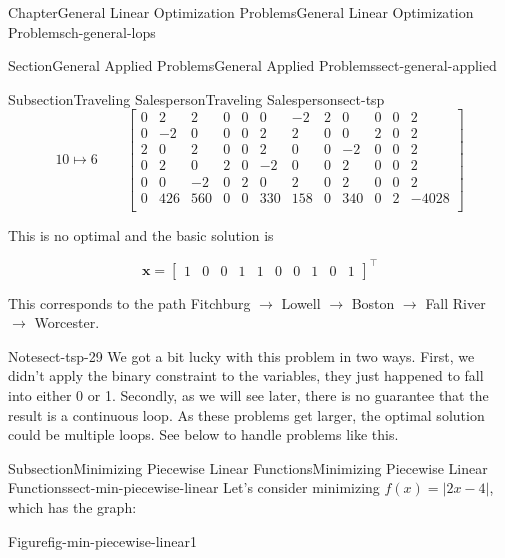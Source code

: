 \documentclass[oneside,10pt,]{book}
\numberwithin{equation}{section}
\newcommand{\amp}{&}
\begin{document}
\begin{chapterptx}{Chapter}{General Linear Optimization Problems}{}{General Linear Optimization Problems}{}{}{ch-general-lops}
\begin{sectionptx}{Section}{General Applied Problems}{}{General Applied Problems}{}{}{sect-general-applied}
\begin{subsectionptx}{Subsection}{Traveling Salesperson}{}{Traveling Salesperson}{}{}{sect-tsp}
\begin{equation*}
10 \mapsto 6 \qquad \left[\begin{array}{rrrrr|rrrrrr|r} 0 \amp 2 \amp 2 \amp 0 \amp 0 \amp 0 \amp -2 \amp 2 \amp 0 \amp 0 \amp 0 \amp 2\\ 0 \amp -2 \amp 0 \amp 0 \amp 0 \amp 2 \amp 2 \amp 0 \amp 0 \amp 2 \amp 0 \amp 2\\ 2 \amp 0 \amp 2 \amp 0 \amp 0 \amp 2 \amp 0 \amp 0 \amp -2 \amp 0 \amp 0 \amp 2\\ 0 \amp 2 \amp 0 \amp 2 \amp 0 \amp -2 \amp 0 \amp 0 \amp 2 \amp 0 \amp 0 \amp 2\\ 0 \amp 0 \amp -2 \amp 0 \amp 2 \amp 0 \amp 2 \amp 0 \amp 2 \amp 0 \amp 0 \amp 2\\ \hline 0 \amp 426 \amp 560 \amp 0 \amp 0 \amp 330 \amp 158 \amp 0 \amp 340 \amp 0 \amp 2 \amp -4028\\ \end{array} \right]
\end{equation*}
%
\par
This is no optimal and the basic solution is%
\par
%
\begin{equation*}
\boldsymbol{x} = \left[ \begin{array}{rrrrrrrrrr} 1 \amp 0 \amp 0 \amp 1 \amp 1 \amp 0 \amp 0 \amp 1  \amp 0 \amp 1 \end{array}\right]^{\intercal}
\end{equation*}
%
\par
This corresponds to the path Fitchburg \(\to\) Lowell \(\to\) Boston \(\to\) Fall River \(\to\) Worcester.%
\begin{note}{Note}{}{sect-tsp-29}%
We got a bit lucky with this problem in two ways. First, we didn't apply the binary constraint to the variables, they just happened to fall into either 0 or 1. Secondly, as we will see later, there is no guarantee that the result is a continuous loop. As these problems get larger, the optimal solution could be multiple loops. See below to handle problems like this.%
\end{note}
\end{subsectionptx}
%
%
\typeout{************************************************}
\typeout{************************************************}
%
\begin{subsectionptx}{Subsection}{Minimizing Piecewise Linear Functions}{}{Minimizing Piecewise Linear Functions}{}{}{sect-min-piecewise-linear}
Let's consider minimizing \(f(x) = |2x-4|\), which has the graph:%
\begin{figureptx}{Figure}{}{fig-min-piecewise-linear1}{}%

\end{figureptx}
\end{subsectionptx}
\end{sectionptx}
\end{chapterptx}
\end{document}
